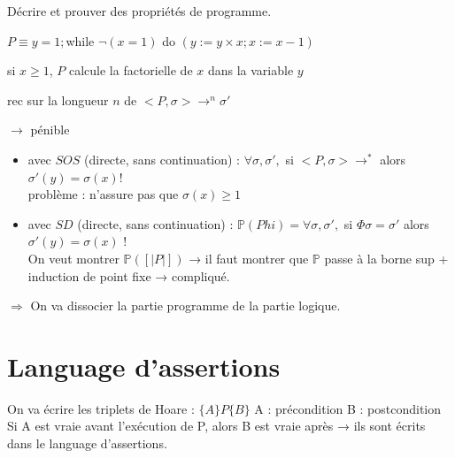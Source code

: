 \documentclass[10pt,a4paper]{article}
\newcommand{\semm}[1]{\left[| #1 | \right]}
\newcommand{\Ps}{\mathbb{P}}
\begin{document}
Décrire et prouver des propriétés de programme.

\begin{ex}
 $P \equiv y=1;$while $\lnot (x=1)$ do $(y:=y \times x; x := x-1)$\\
\begin{minipage}[c]{150pt}
 \begin{propriete}\og si $x \geq 1$, $P$ calcule la factorielle de $x$ dans la variable $y$ \fg\end{propriete}
\end{minipage}\begin{minipage}[c]{150pt}
\begin{dem}
 rec sur la longueur $n$ de $<P, \sigma> →^n \sigma'$
\end{dem}\end{minipage}\hspace{1cm}\begin{minipage}[b]{100pt}
                        $\longrightarrow$ pénible
                       \end{minipage}


\begin{itemize}
 \item avec $SOS$ (directe, sans continuation) : $\forall \sigma, \sigma',$ si $<P, \sigma> →^*$ alors $\sigma'(y) = \sigma(x)$!\\
problème : n'assure pas que $\sigma(x) \geq 1$
\item avec $SD$ (directe, sans continuation) : $\Ps(Phi) = \forall \sigma, \sigma',$ si $\Phi \sigma = \sigma'$ alors $\sigma'(y) = \sigma(x)$ !\\
On veut montrer $\Ps(\semm{P})$ → il faut montrer que $\Ps$ passe à la borne sup + induction de point fixe → compliqué.
\end{itemize}
\end{ex}


$\Rightarrow$ On va dissocier la partie programme de la partie logique.

\section{Language d'assertions}
On va écrire les triplets de Hoare : $\{A\}P\{B\}$
A : précondition
B : postcondition
\og Si A est vraie avant l'exécution de P, alors B est vraie après \fg → ils sont écrits dans le language d'assertions.
\end{document}
